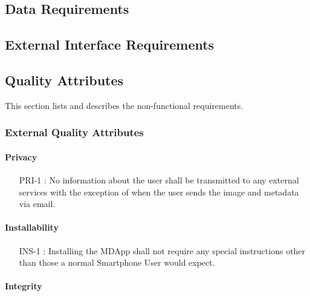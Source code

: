     \subsection{Data Requirements}
    

    \subsection{External Interface Requirements}
        

    \subsection{Quality Attributes}

        This section lists and describes the non-functional requirements.

        \subsubsection{External Quality Attributes}

            \paragraph{Privacy}

                \begin{itemize}[leftmargin=1.4cm]
                    \item[PRI-1 :] No information about the user shall be transmitted to any external services with the exception of when the user sends the image and metadata via email.
                \end{itemize}

            \paragraph{Installability}

                \begin{itemize}[leftmargin=1.4cm]
                    \item[INS-1 :] Installing the MDApp shall not require any special instructions other than those a normal Smartphone User would expect.
                \end{itemize}

            \paragraph{Integrity}

